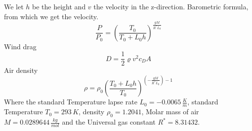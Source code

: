 We let $h$ be the height and $v$ the velocity in the z-direction.
Barometric formula, from which we get the velocity.
\begin{equation}
\frac{P}{P_0} = \left(\frac{T_0}{T_0+L_0h}\right)^{\frac{gM}{R^*L_0}}
\label{eq:BarometricFormula}
\end{equation}
Wind drag
\begin{equation}
D=\frac{1}{2}\varrho v^2c_DA
\label{eq:WindDrag}
\end{equation}
Air density
\begin{equation}
\rho = \rho _0 \left( \frac{T_0+L_0 h}{T_0}\right) ^{\left(-\frac{gM}{R^*L_0}\right)-1}
\label{eq:AirDensity}
\end{equation}
Where the standard Temperature lapse rate $L_0=-0.0065\,\frac{K}{m}$, standard Temperature $T_0=293\,K$, density $\rho_0=1.2041$, Molar mass of air $M=0.0289644\,\frac{kg}{mol}$ and the Universal gas constant $R^*=8.31432$. 